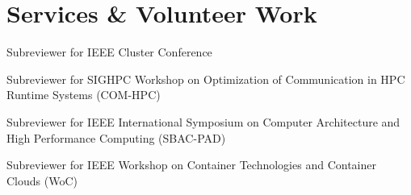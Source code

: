 \section{Services \& Volunteer Work}

   {
    Subreviewer for IEEE Cluster Conference
  }

   {
    Subreviewer for SIGHPC Workshop on Optimization of
    Communication in HPC Runtime Systems (COM-HPC)
  }

   {
    Subreviewer for IEEE International Symposium on Computer Architecture
    and High Performance Computing (SBAC-PAD)
  }

   {
    Subreviewer for IEEE Workshop on Container
    Technologies and Container Clouds (WoC)
  }

